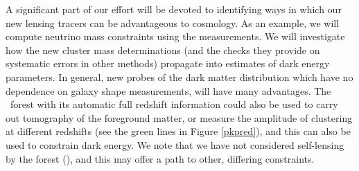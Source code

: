 A significant part of our effort will be devoted to identifying ways 
in which our new lensing tracers can be advantageous to cosmology.
As an example, we will compute neutrino mass constraints using the
measurements. We will investigate how the new cluster mass determinations
(and the checks they provide on systematic errors in other methods)
propagate into estimates of dark energy parameters. In general, new probes
of the dark matter distribution which have no dependence on galaxy shape 
measurements, will have many advantages. The \lya\ forest with its automatic
full redshift information could also be used
to carry out tomography of the foreground matter, or measure the amplitude
of clustering at different redshifts (see the green lines in Figure 
\ref{pkpred}), and this can also be used to constrain dark energy. We note 
that  we  have not considered self-lensing by the forest (\cite{loverde2010}),
and this may offer a path to other, differing constraints.
